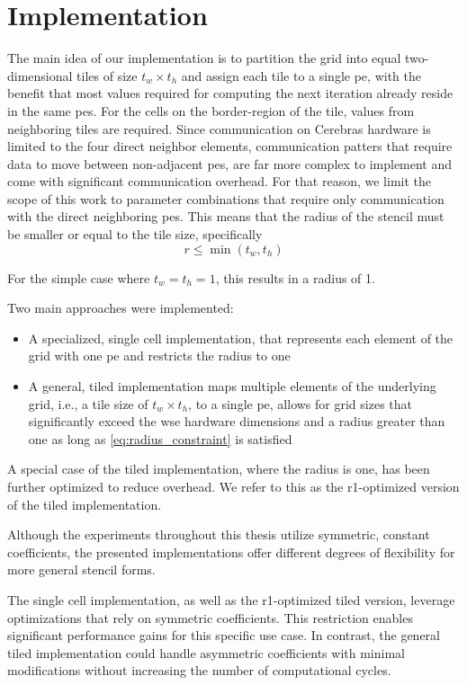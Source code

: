 \chapter{Implementation}
\label{sec:implementation}
The main idea of our implementation is to partition the grid into equal two-dimensional tiles of size $t_w \times t_h$ and assign each tile to a single \ac{pe}, with the benefit that most values required for computing the next iteration already reside in the same \acp{pe}. For the cells on the border-region of the tile, values from neighboring tiles are required. Since communication on Cerebras hardware is limited to the four direct neighbor elements, communication patters that require data to move between non-adjacent \acp{pe}, are far more complex to implement and come with significant communication overhead. For that reason, we limit the scope of this work to parameter combinations that require only communication with the direct neighboring \acp{pe}. This means that the radius of the stencil must be smaller or equal to the tile size, specifically
\begin{equation}    
\label{eq:radius_constraint}
r \leq \min(t_w, t_h)
\end{equation}

For the simple case where $t_w=t_h=1$, this results in a radius of 1.

Two main approaches were implemented:
\begin{itemize}
    \item A specialized, single cell implementation, that represents each element of the grid with one \ac{pe} and restricts the radius to one
    \item A general, tiled implementation maps multiple elements of the underlying grid, i.e., a tile size of $t_w \times t_h$, to a single \ac{pe}, allows for grid sizes that significantly exceed the \ac{wse} hardware dimensions and a radius greater than one as long as \autoref{eq:radius_constraint} is satisfied 
\end{itemize}

A special case of the tiled implementation, where the radius is one, has been further optimized to reduce overhead. We refer to this as the r1-optimized version of the tiled implementation. 

Although the experiments throughout this thesis utilize symmetric, constant coefficients, the presented implementations offer different degrees of flexibility for more general stencil forms.

The single cell implementation, as well as the r1-optimized tiled version, leverage optimizations that rely on symmetric coefficients. This restriction enables significant performance gains for this specific use case. In contrast, the general tiled implementation could handle asymmetric coefficients with minimal modifications without increasing the number of computational cycles.

